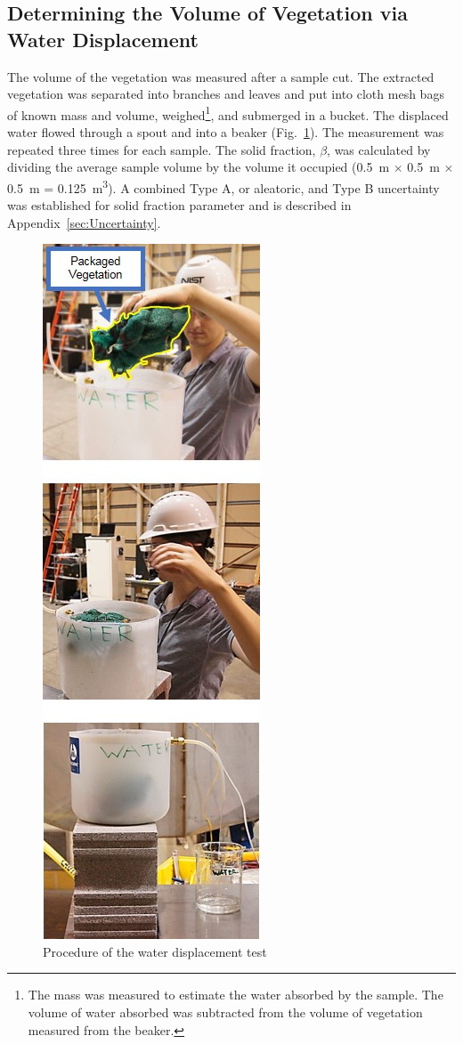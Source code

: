 \documentclass[12pt]{article}
\begin{document}
\subsection{Determining the Volume of Vegetation via Water Displacement}
\label{ssec:waterdisp}

The volume of the vegetation was measured after a sample cut. The extracted vegetation was separated into branches and leaves and put into cloth mesh bags of known mass and volume, weighed\footnote{The mass was measured to estimate the water absorbed by the sample. The volume of water absorbed was subtracted from the volume of vegetation measured from the beaker.}, and submerged in a bucket. The displaced water flowed through a spout and into a beaker (Fig.~\ref{fig:wdt}). The measurement was repeated three times for each sample. The solid fraction, $\beta$, was calculated by dividing the average sample volume by the volume it occupied (0.5~\si{m} $\times$ 0.5~\si{m} $\times$ 0.5~\si{m} = 0.125~\si{m^{3}}). A combined Type A, or aleatoric, and Type B uncertainty was established for solid fraction parameter and is described in Appendix~\ref{sec:Uncertainty}.

\begin{figure} [!]
	\centering 	\includegraphics[height=0.95\textheight,keepaspectratio]{Picture7.jpg}
	\caption{Procedure of the water displacement test}
	\label{fig:wdt}
\end{figure}
\end{document}
